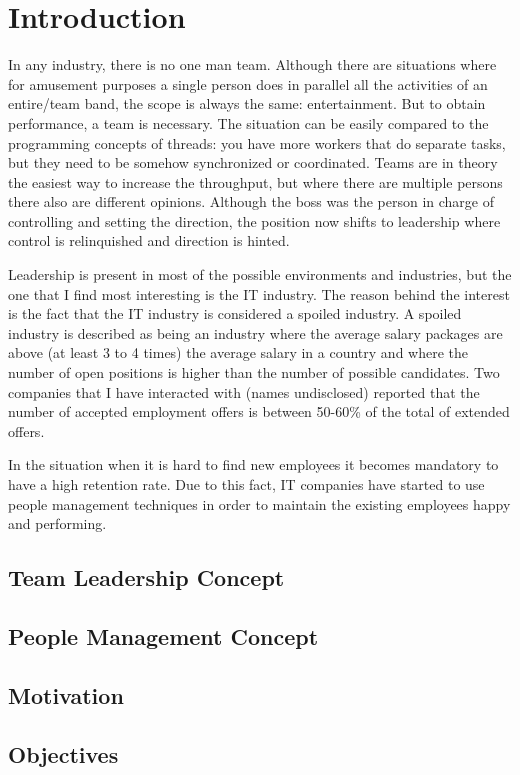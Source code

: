 \chapter{Introduction}
\label{chapter:intro}
In any industry, there is no one man team. Although there are situations where for amusement purposes a single person does in parallel all the activities of an entire/team band, the scope is always the same: entertainment. But to obtain performance, a team is necessary. The situation can be easily compared to the programming concepts of threads: you have more workers that do separate tasks, but they need to be somehow synchronized or coordinated. Teams are in theory the easiest way to increase the throughput, but where there are multiple persons there also are different opinions. Although the boss was the person in charge of controlling and setting the direction, the position now shifts to leadership where control is relinquished and direction is hinted.

Leadership is present in most of the possible environments and industries, but the one that I find most interesting is the IT industry. The reason behind the interest is the fact that the IT industry is considered a spoiled industry. A spoiled industry is described as being an industry where the average salary packages are above (at least 3 to 4 times) the average salary in a country and where the number of open positions is higher than the number of possible candidates. Two companies that I have interacted with (names undisclosed) reported that the number of accepted employment offers is between 50-60\% of the total of extended offers. 

In the situation when it is hard to find new employees it becomes mandatory to have a high retention rate. Due to this fact, IT companies have started to use people management techniques in order to maintain the existing employees happy and performing.

\section{Team Leadership Concept}
\label{sec:tl}

\cite{abur-tl}

\section{People Management Concept}
\label{sec:proj-scope}
\cite{abur-pm}

\section{Motivation}
\label{sec:motivation}

\section{Objectives}
\label{sec:Objectives}
